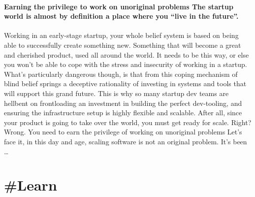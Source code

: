\documentclass[10pt,a4paper]{article}
\begin{document}
\begin{multicols}{2}
\paragraph{}
\textbf{Earning the privilege to work on unoriginal problems
The startup world is almost by definition a place where you “live in the future”.}
\paragraph{}
 Working in an early-stage startup, your whole belief system is based on being able to successfully create something new. Something that will become a great and cherished product, used all around the world. It needs to be this way, or else you won’t be able to cope with the stress and insecurity of working in a startup.
What’s particularly dangerous though, is that from this coping mechanism of blind belief springs a deceptive rationality of investing in systems and tools that will support this grand future. This is why so many startup dev teams are hellbent on frontloading an investment in building the perfect dev-tooling, and ensuring the infrastructure setup is highly flexible and scalable. After all, since your product is going to take over the world, you must get ready for scale. Right? Wrong.
You need to earn the privilege of working on unoriginal problems
Let’s face it, in this day and age, scaling software is not an original problem. It’s been 
\dots\par
\end{multicols}

\newpage
\section{\#Learn}
\end{document}
